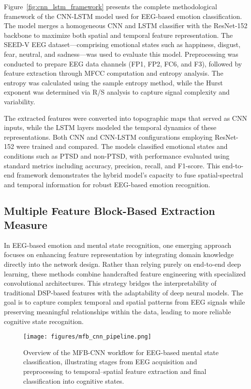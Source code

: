 \documentclass[conference]{IEEEtran}
\begin{document}
Figure~\ref{fig:cnn_lstm_framework} presents the complete methodological framework of the CNN-LSTM model used for EEG-based emotion classification. The model merges a homogeneous CNN and LSTM classifier with the ResNet-152 backbone to maximize both spatial and temporal feature representation. The SEED-V EEG dataset—comprising emotional states such as happiness, disgust, fear, neutral, and sadness—was used to evaluate this model. Preprocessing was conducted to prepare EEG data channels (FP1, FP2, FC6, and F3), followed by feature extraction through MFCC \cite{Chakravarthi2022EEGHybridCNNLSTM} computation and entropy analysis. The entropy was calculated using the sample entropy method, while the Hurst exponent was determined via R/S analysis to capture signal complexity and variability.

The extracted features were converted into topographic maps that served as CNN inputs, while the LSTM layers modeled the temporal dynamics of these representations. Both CNN and CNN-LSTM configurations employing ResNet-152 were trained and compared. The models classified emotional states and conditions such as PTSD and non-PTSD, with performance evaluated using standard metrics including accuracy, precision, recall, and F1-score. This end-to-end framework demonstrates the hybrid model’s capacity to fuse spatial-spectral and temporal information for robust EEG-based emotion recognition.


\subsection{Multiple Feature Block-Based Extraction Measure}
In EEG-based emotion and mental state recognition, one emerging approach focuses on enhancing feature representation by integrating domain knowledge directly into the network design. Rather than relying purely on end-to-end deep learning, these methods combine handcrafted feature engineering with specialized convolutional architectures. This strategy bridges the interpretability of traditional DSP-based features with the adaptability of deep neural models. The goal is to capture complex temporal and spatial patterns from EEG signals while preserving meaningful relationships within the data, leading to more reliable cognitive state recognition.

\begin{figure}[H]
    \centering
    \texttt{[image: figures/mfb\_cnn\_pipeline.png]}
    \caption{Overview of the MFB-CNN workflow for EEG-based mental state classification, illustrating stages from EEG acquisition and preprocessing to temporal–spatial feature extraction and final classification into cognitive states.}
    \label{fig:mfb_cnn_pipeline}
\end{figure}
\end{document}
